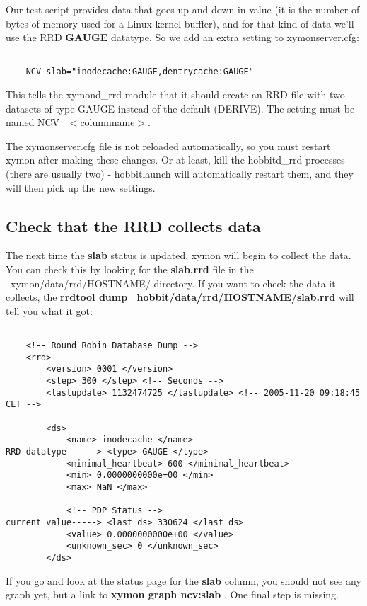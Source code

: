  Our test script provides data that goes up and down in value (it is the number of bytes of memory used for a Linux kernel bufffer), and for that kind of data we'll use the RRD \textbf{GAUGE}
 datatype. So we add an extra setting to xymonserver.cfg:
\begin{verbatim}

	NCV_slab="inodecache:GAUGE,dentrycache:GAUGE"

\end{verbatim}


 This tells the xymond\_rrd module that it should create an RRD file with two datasets of type GAUGE instead of the default (DERIVE). The setting must be named NCV\_$<$columnname$>$.


 The xymonserver.cfg file is not reloaded automatically, so you must restart xymon after making these changes. Or at least, kill the hobbitd\_rrd processes (there are usually two) - hobbitlaunch will automatically restart them, and they will then pick up the new settings.
\subsection{Check that the RRD collects data}


 The next time the \textbf{slab}
 status is updated, xymon will begin to collect the data. You can check this by looking for the \textbf{slab.rrd}
 file in the ~xymon/data/rrd/HOSTNAME/ directory. If you want to check the data it collects, the \textbf{rrdtool dump ~hobbit/data/rrd/HOSTNAME/slab.rrd}
 will tell you what it got: \begin{verbatim}

	<!-- Round Robin Database Dump -->
	<rrd>
		<version> 0001 </version>
		<step> 300 </step> <!-- Seconds -->
		<lastupdate> 1132474725 </lastupdate> <!-- 2005-11-20 09:18:45 CET -->

		<ds>
			<name> inodecache </name>
RRD datatype------>	<type> GAUGE </type>
			<minimal_heartbeat> 600 </minimal_heartbeat>
			<min> 0.0000000000e+00 </min>
			<max> NaN </max>

			<!-- PDP Status -->
current value----->	<last_ds> 330624 </last_ds>
			<value> 0.0000000000e+00 </value>
			<unknown_sec> 0 </unknown_sec>
		</ds>

\end{verbatim}



 If you go and look at the status page for the \textbf{slab}
 column, you should not see any graph yet, but a link to \textbf{xymon graph ncv:slab}
. One final step is missing.
